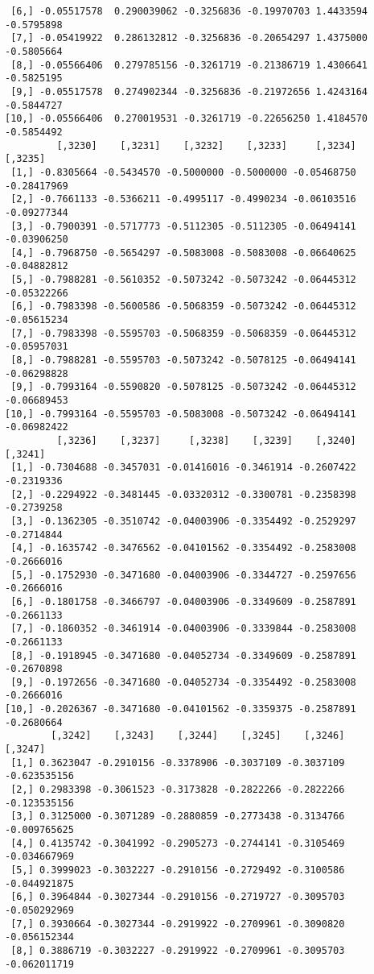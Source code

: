 \documentclass[
  letterpaper,
  DIV=11,
  numbers=noendperiod]{scrreprt}
\begin{document}
\begin{verbatim}
 [6,] -0.05517578  0.290039062 -0.3256836 -0.19970703 1.4433594 -0.5795898
 [7,] -0.05419922  0.286132812 -0.3256836 -0.20654297 1.4375000 -0.5805664
 [8,] -0.05566406  0.279785156 -0.3261719 -0.21386719 1.4306641 -0.5825195
 [9,] -0.05517578  0.274902344 -0.3256836 -0.21972656 1.4243164 -0.5844727
[10,] -0.05566406  0.270019531 -0.3261719 -0.22656250 1.4184570 -0.5854492
         [,3230]    [,3231]    [,3232]    [,3233]     [,3234]     [,3235]
 [1,] -0.8305664 -0.5434570 -0.5000000 -0.5000000 -0.05468750 -0.28417969
 [2,] -0.7661133 -0.5366211 -0.4995117 -0.4990234 -0.06103516 -0.09277344
 [3,] -0.7900391 -0.5717773 -0.5112305 -0.5112305 -0.06494141 -0.03906250
 [4,] -0.7968750 -0.5654297 -0.5083008 -0.5083008 -0.06640625 -0.04882812
 [5,] -0.7988281 -0.5610352 -0.5073242 -0.5073242 -0.06445312 -0.05322266
 [6,] -0.7983398 -0.5600586 -0.5068359 -0.5073242 -0.06445312 -0.05615234
 [7,] -0.7983398 -0.5595703 -0.5068359 -0.5068359 -0.06445312 -0.05957031
 [8,] -0.7988281 -0.5595703 -0.5073242 -0.5078125 -0.06494141 -0.06298828
 [9,] -0.7993164 -0.5590820 -0.5078125 -0.5073242 -0.06445312 -0.06689453
[10,] -0.7993164 -0.5595703 -0.5083008 -0.5073242 -0.06494141 -0.06982422
         [,3236]    [,3237]     [,3238]    [,3239]    [,3240]    [,3241]
 [1,] -0.7304688 -0.3457031 -0.01416016 -0.3461914 -0.2607422 -0.2319336
 [2,] -0.2294922 -0.3481445 -0.03320312 -0.3300781 -0.2358398 -0.2739258
 [3,] -0.1362305 -0.3510742 -0.04003906 -0.3354492 -0.2529297 -0.2714844
 [4,] -0.1635742 -0.3476562 -0.04101562 -0.3354492 -0.2583008 -0.2666016
 [5,] -0.1752930 -0.3471680 -0.04003906 -0.3344727 -0.2597656 -0.2666016
 [6,] -0.1801758 -0.3466797 -0.04003906 -0.3349609 -0.2587891 -0.2661133
 [7,] -0.1860352 -0.3461914 -0.04003906 -0.3339844 -0.2583008 -0.2661133
 [8,] -0.1918945 -0.3471680 -0.04052734 -0.3349609 -0.2587891 -0.2670898
 [9,] -0.1972656 -0.3471680 -0.04052734 -0.3354492 -0.2583008 -0.2666016
[10,] -0.2026367 -0.3471680 -0.04101562 -0.3359375 -0.2587891 -0.2680664
        [,3242]    [,3243]    [,3244]    [,3245]    [,3246]      [,3247]
 [1,] 0.3623047 -0.2910156 -0.3378906 -0.3037109 -0.3037109 -0.623535156
 [2,] 0.2983398 -0.3061523 -0.3173828 -0.2822266 -0.2822266 -0.123535156
 [3,] 0.3125000 -0.3071289 -0.2880859 -0.2773438 -0.3134766 -0.009765625
 [4,] 0.4135742 -0.3041992 -0.2905273 -0.2744141 -0.3105469 -0.034667969
 [5,] 0.3999023 -0.3032227 -0.2910156 -0.2729492 -0.3100586 -0.044921875
 [6,] 0.3964844 -0.3027344 -0.2910156 -0.2719727 -0.3095703 -0.050292969
 [7,] 0.3930664 -0.3027344 -0.2919922 -0.2709961 -0.3090820 -0.056152344
 [8,] 0.3886719 -0.3032227 -0.2919922 -0.2709961 -0.3095703 -0.062011719

\end{verbatim}
\end{document}
